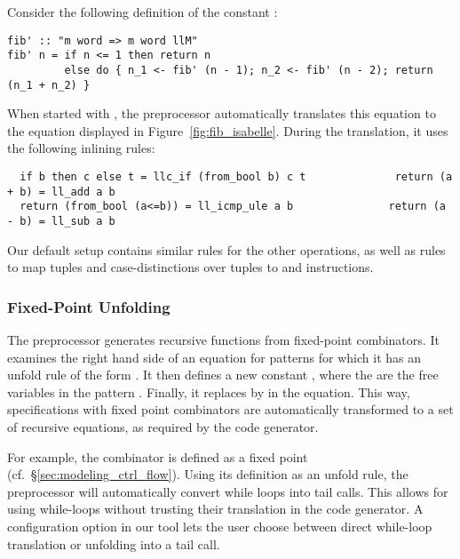 \documentclass[a4paper,USenglish,cleveref, autoref]{lipics-v2019}
\begin{document}
\begin{example}
Consider the following definition of the constant :
\begin{lstlisting}
fib' :: "m word => m word llM"
fib' n = if n <= 1 then return n 
         else do { n_1 <- fib' (n - 1); n_2 <- fib' (n - 2); return (n_1 + n_2) }
\end{lstlisting}
When started with , the preprocessor automatically translates this equation 
to the equation displayed in Figure~\ref{fig:fib_isabelle}. During the translation, it uses the following inlining rules:
\begin{lstlisting}
  if b then c else t = llc_if (from_bool b) c t              return (a + b) = ll_add a b
  return (from_bool (a<=b)) = ll_icmp_ule a b               return (a - b) = ll_sub a b
\end{lstlisting}
Our default setup contains similar rules for the other operations, as well as rules to map tuples and case-distinctions over tuples to  and  instructions.
\end{example}

\subsubsection{Fixed-Point Unfolding}
The preprocessor generates recursive functions from fixed-point combinators. 
It examines the right hand side of an equation for patterns  for which it has an unfold rule of the form .
It then defines a new constant , where the  are the free variables in the pattern .
Finally, it replaces  by  in the equation. This way, specifications with fixed point combinators are automatically 
transformed to a set of recursive equations, as required by the code generator.

For example, the  combinator is defined as a fixed point (cf.~\S\ref{sec:modeling_ctrl_flow}). 
Using its definition as an unfold rule, the preprocessor will automatically convert while loops into tail calls.
This allows for using while-loops without trusting their translation in the code generator. 
A configuration option in our tool lets the user choose between direct while-loop translation or unfolding into a tail call.
\end{document}
